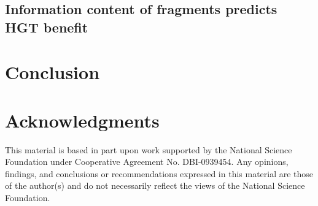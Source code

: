 \documentclass[letterpaper]{article}
\begin{document}
\subsection{Information content of fragments predicts HGT benefit}

\section{Conclusion}

\section{Acknowledgments}

This material is based in part upon work supported by the National Science Foundation under Cooperative Agreement No. DBI-0939454. Any opinions, findings, and conclusions or recommendations expressed in this material are those of the author(s) and do not necessarily reflect the views of the National Science Foundation.
\footnotesize

 
\end{document}
